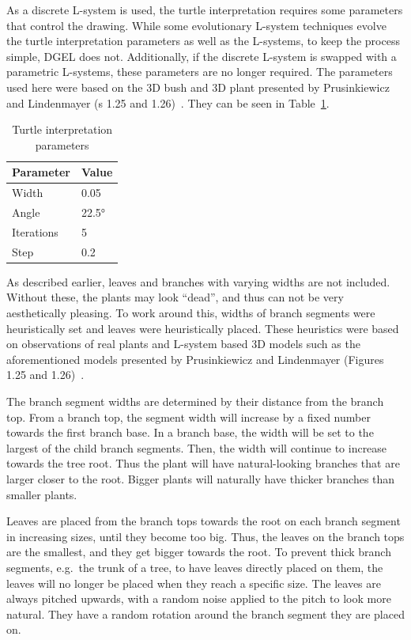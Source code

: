 As a discrete L-system is used, the turtle interpretation requires some parameters that control the drawing.
While some evolutionary L-system techniques evolve the turtle interpretation parameters as well as the L-systems, to keep the process simple, DGEL does not.
Additionally, if the discrete L-system is swapped with a parametric L-systems, these parameters are no longer required.
The parameters used here were based on the 3D bush and 3D plant presented by Prusinkiewicz and Lindenmayer (s 1.25 and 1.26)~\cite{2012Prusinkiewicz}.
They can be seen in Table~\ref{tab:turtle-param}.

\begin{table}
    \centering
    \begin{tabular}{| l | l |}
    \hline
    \textbf{Parameter} & \textbf{Value} \\ \hline
    Width & 0.05 \\ \hline
    Angle & 22.5° \\ \hline
    Iterations & 5 \\ \hline
    Step & 0.2 \\
    \hline
    \end{tabular}
    \caption{Turtle interpretation parameters}
    \label{tab:turtle-param}
\end{table}

As described earlier, leaves and branches with varying widths are not included.
Without these, the plants may look ``dead'', and thus can not be very aesthetically pleasing.
To work around this, widths of branch segments were heuristically set and leaves were heuristically placed.
These heuristics were based on observations of real plants and L-system based 3D models such as the aforementioned models presented by Prusinkiewicz and Lindenmayer (Figures 1.25 and 1.26)~\cite{2012Prusinkiewicz}.

The branch segment widths are determined by their distance from the branch top.
From a branch top, the segment width will increase by a fixed number towards the first branch base.
In a branch base, the width will be set to the largest of the child branch segments.
Then, the width will continue to increase towards the tree root.
Thus the plant will have natural-looking branches that are larger closer to the root.
Bigger plants will naturally have thicker branches than smaller plants.

Leaves are placed from the branch tops towards the root on each branch segment in increasing sizes, until they become too big.
Thus, the leaves on the branch tops are the smallest, and they get bigger towards the root.
To prevent thick branch segments, e.g.\ the trunk of a tree, to have leaves directly placed on them, the leaves will no longer be placed when they reach a specific size.
The leaves are always pitched upwards, with a random noise applied to the pitch to look more natural.
They have a random rotation around the branch segment they are placed on.

